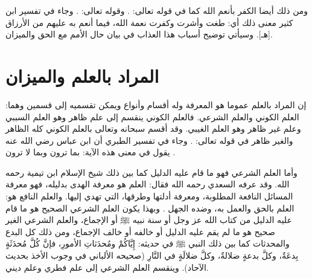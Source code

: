 ومن ذلك أيضا الكفر بأنعم الله كما في قوله تعالى:
\quranayah*[16][112]{\footnotesize \surahname*[16]}. وقوله تعالى:
\quranayah*[28][58]{\footnotesize \surahname*[28]}. وجاء في تفسير ابن كثير معنى ذلك أي: طغت وأشرت وكفرت نعمة الله، فيما أنعم به عليهم من الأرزاق [هـ]. وسيأتي توضيح أسباب هذا العذاب في بيان حال الأمم مع الحق والميزان.

\section{المراد بالعلم والميزان}

إن المراد بالعلم عموما هو المعرفة وله أقسام وأنواع ويمكن تقسميه إلى قسمين وهما: العلم الكوني والعلم الشرعي. فالعلم الكوني ينقسم إلى علم ظاهر وهو العلم السببي وعلم غير ظاهر وهو العلم الغيبي. وقد أقسم سبحانه وتعالى بالعلم الكوني كله الظاهر والغير ظاهر في قوله تعالى: \quranayah*[69][38-39]{\footnotesize \surahname*[69]}. وجاء في تفسير الطبري أن ابن عباس رضي الله عنه يقول في معنى هذه الآية: بما ترون وبما لا ترون \href{https://shamela.ws/book/7798/15576#p1}{\faExternalLink} \cite{tafsir_Tabari}.

وأما العلم الشرعي فهو ما قام عليه الدليل كما بين ذلك شيخ الإسلام ابن تيمية رحمه الله. وقد عرفه السعدي رحمه الله فقال: العلم هو معرفة الهدى بدليله، فهو معرفة المسائل النافعة المطلوبة، ومعرفة أدلتها وطرقها، التي تهدي إليها. والعلم النافع هو: العلم بالحق والعمل به، وضده الجهل \href{https://shamela.ws/book/42/2144#p20}{\faExternalLink} \cite{tafsir_Saadi}. وبهذا يكون العلم الشرعي الصحيح هو ما قام عليه الدليل من كتاب الله عز وجل أو سنة نبيه ﷺ أو الإجماع، والعلم الشرعي الغير صحيح هو ما لم يقم عليه الدليل أو خالفه أو خالف الإجماع، ومن ذلك كل البدع والمحدثات كما بين ذلك النبي ﷺ في حديثه: إِيَّاكُمْ ومُحدَثاتِ الأمورِ، فإنَّ كُلَّ مُحدَثَةٍ بِدعَةٌ، وكلَّ بدعةٍ ضلالةٌ، وكلَّ ضلالَةٍ في النَّارِ {\footnotesize (صحيحه الألباني في وجوب الأخذ بحديث الآحاد)}. وينقسم العلم الشرعي إلى علم فطري وعلم ديني. 

